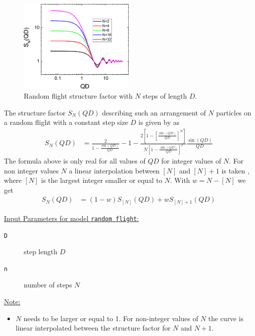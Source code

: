 \begin{figure}[htb]
\begin{center}
\includegraphics[width=0.5\textwidth]{../images/structure_factor/randomflight.png}
\end{center}
\caption{Random flight structure factor with $N$ steps of length $D$.}
\label{fig:randomflight}
\end{figure}

The structure factor $S_N(QD)$ describing such an arrangement of $N$ particles on a random flight
with a constant step size $D$ is given by \cite{Burchard1970} as
\begin{align}
S_N(QD)&=
    \frac{2}{1-\frac{\sin(QD)}{QD}}-1-\frac{2\left[1-\left[\frac{\sin(QD)}{QD}\right]^N\right]}{N\left[1-\frac{\sin(QD)}{QD}\right]^2}\frac{\sin(QD)}{QD}
\end{align}
The formula above is only real for all values of $QD$ for integer values of $N$. For non integer values $N$ a linear interpolation between $[N]$ and $[N]+1$ is taken \cite{Giehm2010}, where $[N]$ is the largest integer smaller or equal to $N$. With $w=N-[N]$ we get
\begin{align}
S_N(QD)&= (1-w)S_{[N]}(QD) + wS_{[N]+1}(QD)
\end{align}

\noindent \underline{Input Parameters for model \texttt{random flight}:}\\
\begin{description}
\item[\texttt{D}] step length $D$
\item[\texttt{n}] number of steps $N$
\end{description}


\noindent\underline{Note:}
\begin{itemize}
\item $N$ needs to be larger or equal to 1. For non-integer values of $N$ the curve is linear interpolated between the structure factor for $N$ and $N+1$.
\end{itemize}

